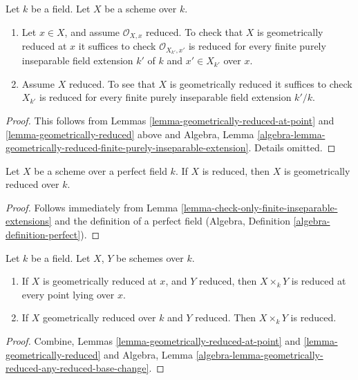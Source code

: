 \begin{lemma}
\label{lemma-check-only-finite-inseparable-extensions}
Let $k$ be a field. Let $X$ be a scheme over $k$.
\begin{enumerate}
\item Let $x \in X$, and assume $\mathcal{O}_{X, x}$ reduced.
To check that $X$ is geometrically reduced at $x$ it suffices to check
$\mathcal{O}_{X_{k'}, x'}$ is reduced for every
finite purely inseparable field extension $k'$ of $k$ and
$x' \in X_{k'}$ over $x$.
\item Assume $X$ reduced.
To see that $X$ is geometrically reduced it suffices to check
$X_{k'}$ is reduced for every finite purely inseparable field
extension $k'/k$.
\end{enumerate}
\end{lemma}

\begin{proof}
This follows from Lemmas \ref{lemma-geometrically-reduced-at-point}
and \ref{lemma-geometrically-reduced} above and Algebra, Lemma
\ref{algebra-lemma-geometrically-reduced-finite-purely-inseparable-extension}.
Details omitted.
\end{proof}

\begin{lemma}
\label{lemma-perfect-reduced}
Let $X$ be a scheme over a perfect field $k$.
If $X$ is reduced, then $X$ is geometrically reduced over $k$.
\end{lemma}

\begin{proof}
Follows immediately from
Lemma \ref{lemma-check-only-finite-inseparable-extensions}
and the definition of a perfect field
(Algebra, Definition \ref{algebra-definition-perfect}).
\end{proof}

\begin{lemma}
\label{lemma-geometrically-reduced-any-base-change}
Let $k$ be a field.
Let $X$, $Y$ be schemes over $k$.
\begin{enumerate}
\item If $X$ is geometrically reduced at $x$, and $Y$ reduced,
then $X \times_k Y$ is reduced at every point lying over $x$.
\item If $X$ geometrically reduced over $k$ and $Y$ reduced.
Then $X \times_k Y$ is reduced.
\end{enumerate}
\end{lemma}

\begin{proof}
Combine, Lemmas \ref{lemma-geometrically-reduced-at-point}
and \ref{lemma-geometrically-reduced} and Algebra,
Lemma \ref{algebra-lemma-geometrically-reduced-any-reduced-base-change}.
\end{proof}

